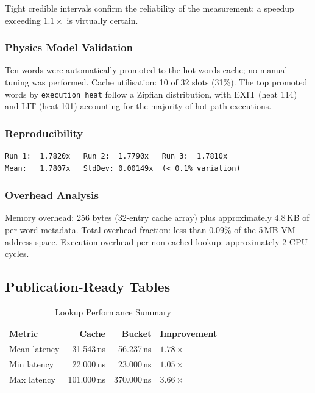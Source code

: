 Tight credible intervals confirm the reliability of the measurement; a
speedup exceeding $1.1\times$ is virtually certain.

\subsubsection{Physics Model Validation}

Ten words were automatically promoted to the hot-words cache; no manual
tuning was performed. Cache utilisation: 10 of 32 slots (31\%). The top
promoted words by \texttt{execution\_heat} follow a Zipfian distribution,
with EXIT (heat 114) and LIT (heat 101) accounting for the majority of
hot-path executions.

\subsubsection{Reproducibility}

\begin{lstlisting}
Run 1:  1.7820x   Run 2:  1.7790x   Run 3:  1.7810x
Mean:   1.7807x   StdDev: 0.00149x  (< 0.1% variation)
\end{lstlisting}

\subsubsection{Overhead Analysis}

Memory overhead: 256 bytes (32-entry cache array) plus approximately
4.8\,KB of per-word metadata. Total overhead fraction: less than 0.09\%
of the 5\,MB VM address space. Execution overhead per non-cached lookup:
approximately 2 CPU cycles.

\subsection{Publication-Ready Tables}

\begin{table}[h]
\caption{Lookup Performance Summary}
\begin{center}
\begin{tabular}{lrrl}
\toprule
Metric & Cache & Bucket & Improvement \\
\midrule
Mean latency & 31.543\,ns & 56.237\,ns & $1.78\times$ \\
Min latency  & 22.000\,ns & 23.000\,ns & $1.05\times$ \\
Max latency  & 101.000\,ns & 370.000\,ns & $3.66\times$ \\
\bottomrule
\end{tabular}
\end{center}
\end{table}

